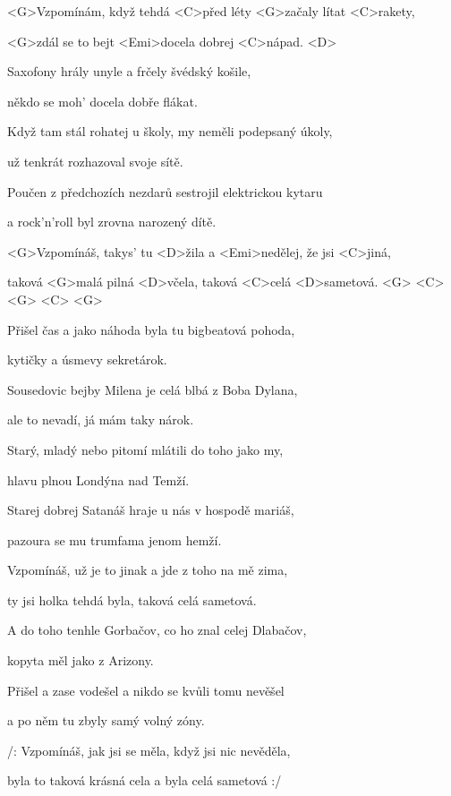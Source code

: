 

\zs
<G>Vzpomínám, když tehdá <C>před léty
<G>začaly lítat <C>rakety,

<G>zdál se to bejt <Emi>docela dobrej <C>nápad. <D>

Saxofony hrály unyle a frčely švédský košile,

někdo se moh' docela dobře flákat.
\ks

\zs
Když tam stál rohatej u školy, my neměli podepsaný úkoly,

už tenkrát rozhazoval svoje sítě.

Poučen z předchozích nezdarů sestrojil elektrickou kytaru

a rock'n'roll byl zrovna narozený dítě.
\ks

\zr
<G>Vzpomínáš, takys' tu <D>žila a <Emi>nedělej, že jsi <C>jiná,

taková <G>malá pilná <D>včela, taková <C>celá <D>sametová. <G> <C> <G> <C> <G>
\kr

\zs
Přišel čas a jako náhoda byla tu bigbeatová pohoda,

kytičky a úsmevy sekretárok.

Sousedovic bejby Milena je celá blbá z Boba Dylana,

ale to nevadí, já mám taky nárok.
\ks

\zs
Starý, mladý nebo pitomí mlátili do toho jako my,

hlavu plnou Londýna nad Temží.

Starej dobrej Satanáš hraje u nás v hospodě mariáš,

pazoura se mu trumfama jenom hemží.
\ks

\zr
Vzpomínáš, už je to jinak a jde z toho na mě zima,

ty jsi holka tehdá byla, taková celá sametová.
\kr

\zs
A do toho tenhle Gorbačov, co ho znal celej Dlabačov,

kopyta měl jako z Arizony.

Přišel a zase vodešel a nikdo se kvůli tomu nevěšel

a po něm tu zbyly samý volný zóny.
\ks

\zr
/: Vzpomínáš, jak jsi se měla,
když jsi nic nevěděla,

byla to taková krásná cela a byla celá sametová :/
\kr

